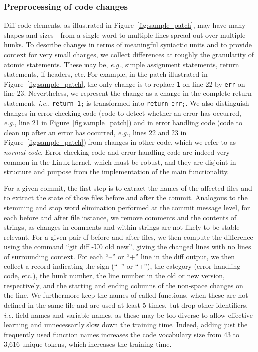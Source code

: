 \subsubsection{Preprocessing of code changes}
\label{sec:extract_level_diff}

Diff code elements, as illustrated in Figure~\ref{fig:sample_patch}, may
have many shapes and sizes - from a single word to multiple lines spread
out over multiple hunks. To describe changes in terms of meaningful
syntactic units and to provide context for very small changes, we collect
differences at roughly the granularity of atomic statements. These may be,
{\em e.g.}, simple assignment statements, return statements, if headers,
etc.  For example, in the patch illustrated in
Figure~\ref{fig:sample_patch}, the only change is to replace {\tt 1} on
line 22 by {\tt err} on line 23.  Nevertheless, we represent the change as
a change in the complete return statement, {\em i.e.}, {\tt return 1;} is
transformed into {\tt return err;}.  We also distinguish changes in error
checking code (code to detect whether an error has occurred, {\em e.g.}, line
21 in Figure~\ref{fig:sample_patch}) and in error handling code (code to
clean up after an error has occurred, {\em e.g.}, lines 22 and 23 in
Figure~\ref{fig:sample_patch}) from changes in other code, which we refer
to as {\em normal code}. Error checking code and error handling code are
indeed very common in the Linux kernel, which must be robust, and they are
disjoint in structure and purpose from the implementation of the main
functionality.

For a given commit, the first step is to extract the names of the affected
files and to extract the state of those files before and after the
commit. Analogous to the stemming and stop word elimination performed at
the commit message level, for each before and after file instance, we
remove comments and the contents of strings, as changes in comments and
within strings are not likely to be stable-relevant. For a given pair of
before and after files, we then compute the difference using the command
``git diff -U0 old new'', giving the changed lines with no lines of
%
%
surrounding context. For each ``--'' or ``+'' line in the diff output, we
then collect a record indicating the sign (``--'' or ``+''), the category
(error-handling code, etc.), the hunk number, the line number in the old or
new version, respectively, and the starting and ending columns of the
non-space changes on the line.  We furthermore keep the names of called
functions, when these are not defined in the same file and are used at
least 5 times, but drop other identifiers, {\em i.e.} field names and
variable names, as these may be too diverse to allow effective learning and unnecessarily slow down the training time.
Indeed, adding just the frequently used function names increases the code
vocabulary size from 43 to 3,616 unique tokens, which
increases the training time.

